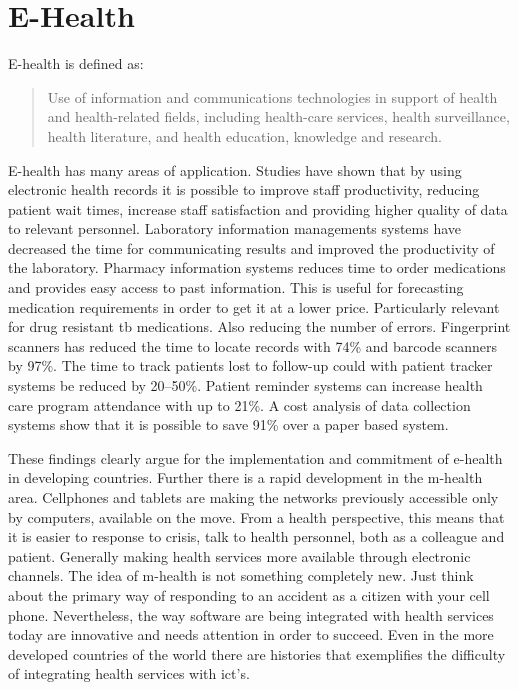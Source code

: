 
\section{E-Health}
E-health is defined as:
\begin{quotation}
Use of information and communications technologies in support of health and health-related fields, including health-care services, health surveillance, health literature, and health education, knowledge and research.
\end{quotation}

E-health has many areas of application. Studies have shown that by using electronic health records it is possible to improve staff productivity, reducing patient wait times, increase staff satisfaction and providing higher quality of data to relevant personnel. Laboratory information managements systems have decreased the time for communicating results and improved the productivity of the laboratory. Pharmacy information systems reduces time to order medications and provides easy access to past information. This is useful for forecasting medication requirements in order to get it at a lower price. Particularly relevant for drug resistant \gls{tb} medications. Also reducing the number of errors. Fingerprint scanners has reduced the time to locate records with 74\% and barcode scanners by 97\%. The time to track patients lost to follow-up could with patient tracker systems be reduced by 20--50\%. Patient reminder systems can increase health care program attendance with up to 21\%. A cost analysis of data collection systems show that it is possible to save 91\% over a paper based system. 

These findings clearly argue for the implementation and commitment of e-health in developing countries. 
Further there is a rapid development in the m-health area.
Cellphones and tablets are making the networks previously accessible only by computers, available on the move.
From a health perspective, this means that it is easier to response to crisis, talk to health personnel, both as a colleague and patient. 
Generally making health services more available through electronic channels. 
The idea of m-health is not something completely new. Just think about the primary way of responding to an accident as a citizen with your cell phone. 
Nevertheless, the way software are being integrated with health services today are innovative and needs attention in order to succeed.
Even in the more developed countries of the world there are histories that exemplifies the difficulty of integrating health services with \gls{ict}'s.  

